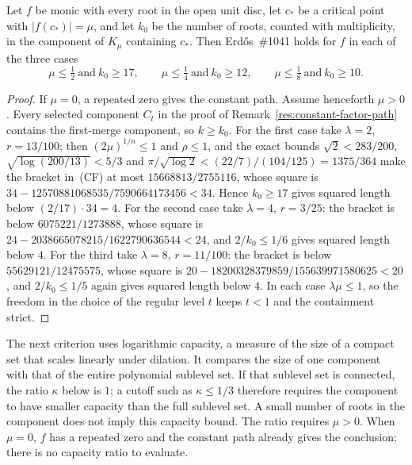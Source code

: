 \begin{remark}
\label{res:constant-factor-arity}
Let $f$ be monic with every root in the open unit disc, let $c_*$ be a
critical point with $|f(c_*)|=\mu$, and let $k_0$ be the number of roots,
counted with multiplicity, in the component of $K_\mu$ containing $c_*$.
Then Erd\H{o}s~\#1041 holds for $f$ in each of the three cases
\[
 \mu\le\tfrac12\ \text{and}\ k_0\ge17,\qquad
 \mu\le\tfrac14\ \text{and}\ k_0\ge12,\qquad
 \mu\le\tfrac18\ \text{and}\ k_0\ge10 .
\]
\end{remark}


\begin{proof}
If $\mu=0$, a repeated zero gives the constant path. Assume henceforth
$\mu>0$. Every selected component $C_t$ in the proof of
Remark~\ref{res:constant-factor-path} contains the first-merge component, so
$k\ge k_0$.  For the first case take $\lambda=2$, $r=13/100$; then
$(2\mu)^{1/n}\le1$ and $\rho\le1$, and the exact bounds
$\sqrt2<283/200$, $\sqrt{\log(200/13)}<5/3$ and
$\pi/\sqrt{\log2}<(22/7)/(104/125)=1375/364$ make the bracket in~(CF) at most
$15668813/2755116$, whose square is $34-12570881068535/7590664173456<34$.
Hence $k_0\ge17$ gives squared length below $(2/17)\cdot34=4$.  For the second
case take $\lambda=4$, $r=3/25$: the bracket is below $6075221/1273888$, whose
square is $24-2038665078215/1622790636544<24$, and $2/k_0\le1/6$ gives squared
length below $4$.  For the third take $\lambda=8$, $r=11/100$: the bracket is
below $55629121/12475575$, whose square is
$20-18200328379859/155639971580625<20$, and $2/k_0\le1/5$ again gives squared
length below $4$.  In each case $\lambda\mu\le1$, so the freedom in
the choice of the regular level $t$ keeps $t<1$ and the containment strict.
\end{proof}

The next criterion uses logarithmic capacity, a measure of the size of a
compact set that scales linearly under dilation. It compares the size of
one component with that of the entire polynomial sublevel set. If that
sublevel set is connected, the ratio $\kappa$ below is $1$; a cutoff such
as $\kappa\le1/3$ therefore requires the component to have smaller
capacity than the full sublevel set. A small number of roots in the
component does not imply this capacity bound. The ratio requires $\mu>0$. When $\mu=0$,
$f$ has a repeated zero and the constant path already gives the conclusion;
there is no capacity ratio to evaluate.

